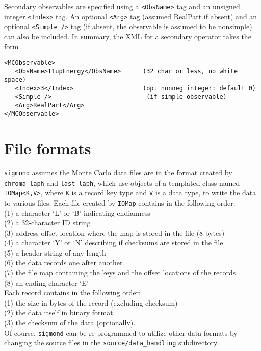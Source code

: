 \documentclass[12pt]{article}
\newcommand{\vb}{\texttt}
\begin{document}
Secondary observables are specified using a \vb{<ObsName>} tag and
an unsigned integer \vb{<Index>} tag.  An optional \vb{<Arg>} tag
(assumed RealPart if absent) and an optional \vb{<Simple />}
tag (if absent, the observable is assumed to be nonsimple) can also
be included.   In summary, the XML for a secondary operator takes the form
\begin{verbatim}
<MCObservable>
   <ObsName>T1upEnergy</ObsName>      (32 char or less, no white space)
   <Index>3</Index>                   (opt nonneg integer: default 0)
   <Simple />                          (if simple observable)
   <Arg>RealPart</Arg>
</MCObservable>
\end{verbatim}

\section{File formats}

\vb{sigmond} assumes the Monte Carlo data files are in the format
created by \vb{chroma\_laph} and \vb{last\_laph}, which use objects
of a templated class named \vb{IOMap<K,V>}, where \vb{K} is a record 
key type and \vb{V} is a data type, to write the data to various
files.  Each file created by \vb{IOMap} contains in the following order:\\
\hspace*{20pt}(1) a character `L' or `B' indicating endianness\\
\hspace*{20pt}(2) a 32-character ID string\\
\hspace*{20pt}(3) address offset location where the map is stored in the file (8 bytes) \\
\hspace*{20pt}(4) a character `Y' or `N' describing if checksums are stored in the file \\
\hspace*{20pt}(5) a header string of any length\\
\hspace*{20pt}(6) the data records one after another \\
\hspace*{20pt}(7) the file map containing the keys and the offset locations of the records\\
\hspace*{20pt}(8) an ending character `E'\\
Each record contains in the following order:\\
\hspace*{20pt}(1) the size in bytes of the record (excluding checksum)\\
\hspace*{20pt}(2) the data itself in binary format\\
\hspace*{20pt}(3) the checksum of the data (optionally).\\
Of course, \vb{sigmond} can be re-programmed to utilize other data formats
by changing the source files in the \vb{source/data\_handling} subdirectory.
\end{document}
